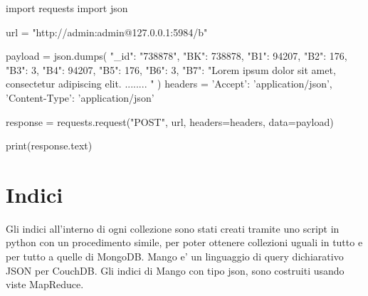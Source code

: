 \begin{Verbatim*}
import requests
import json

url = "http://admin:admin@127.0.0.1:5984/b"

payload = json.dumps({
  "_id": "738878",
  "BK": 738878,
  "B1": 94207,
  "B2": 176,
  "B3": 3,
  "B4": 94207,
  "B5": 176,
  "B6": 3,
  "B7": "Lorem ipsum dolor sit amet, consectetur adipiscing elit. ........ " 
})
headers = {
  'Accept': 'application/json', 
  'Content-Type': 'application/json'
}

response = requests.request("POST", url, headers=headers, data=payload)

print(response.text)
\end{Verbatim*}

\section{Indici}

Gli indici all'interno di ogni collezione sono stati creati tramite uno script in python con un procedimento simile, per poter ottenere collezioni uguali in tutto e per tutto a 
quelle di MongoDB. 
Mango e' un linguaggio di query dichiarativo JSON per CouchDB. Gli indici di Mango con tipo json, sono costruiti usando viste MapReduce.

